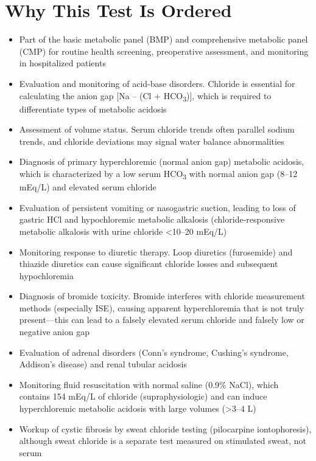 \section*{Why This Test Is Ordered}
\begin{itemize}
  \item Part of the basic metabolic panel (BMP) and comprehensive metabolic panel (CMP) for routine health screening, preoperative assessment, and monitoring in hospitalized patients
  \item Evaluation and monitoring of acid-base disorders. Chloride is essential for calculating the anion gap [Na -- (Cl + HCO\textsubscript{3})], which is required to differentiate types of metabolic acidosis
  \item Assessment of volume status. Serum chloride trends often parallel sodium trends, and chloride deviations may signal water balance abnormalities
  \item Diagnosis of primary hyperchloremic (normal anion gap) metabolic acidosis, which is characterized by a low serum HCO\textsubscript{3} with normal anion gap (8--12 mEq/L) and elevated serum chloride
  \item Evaluation of persistent vomiting or nasogastric suction, leading to loss of gastric HCl and hypochloremic metabolic alkalosis (chloride-responsive metabolic alkalosis with urine chloride <10--20 mEq/L)
  \item Monitoring response to diuretic therapy. Loop diuretics (furosemide) and thiazide diuretics can cause significant chloride losses and subsequent hypochloremia
  \item Diagnosis of bromide toxicity. Bromide interferes with chloride measurement methods (especially ISE), causing apparent hyperchloremia that is not truly present---this can lead to a falsely elevated serum chloride and falsely low or negative anion gap
  \item Evaluation of adrenal disorders (Conn's syndrome, Cushing's syndrome, Addison's disease) and renal tubular acidosis
  \item Monitoring fluid resuscitation with normal saline (0.9\% NaCl), which contains 154 mEq/L of chloride (supraphysiologic) and can induce hyperchloremic metabolic acidosis with large volumes (>3--4 L)
  \item Workup of cystic fibrosis by sweat chloride testing (pilocarpine iontophoresis), although sweat chloride is a separate test measured on stimulated sweat, not serum
\end{itemize}

